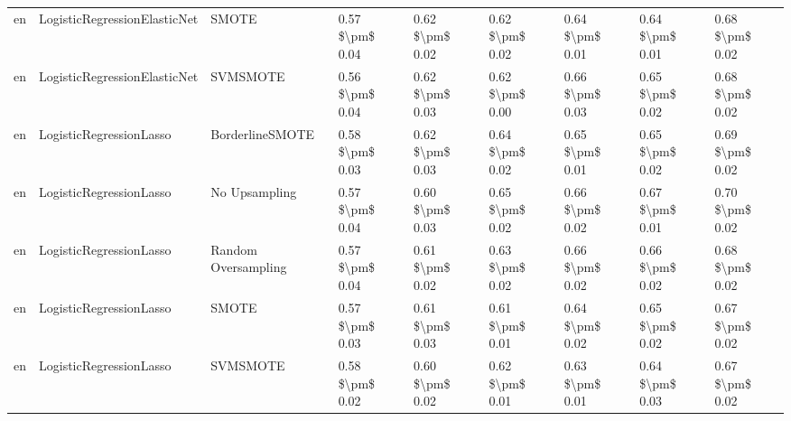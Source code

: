 \begin{tabular}{lllllllll}
      en &    LogisticRegressionElasticNet &                         SMOTE &     0.57 \$\textbackslash pm\$ 0.04 &           0.62 \$\textbackslash pm\$ 0.02 &       0.62 \$\textbackslash pm\$ 0.02 &        0.64 \$\textbackslash pm\$ 0.01 &                         0.64 \$\textbackslash pm\$ 0.01 &     0.68 \$\textbackslash pm\$ 0.02 \\
      en &    LogisticRegressionElasticNet &                      SVMSMOTE &     0.56 \$\textbackslash pm\$ 0.04 &           0.62 \$\textbackslash pm\$ 0.03 &       0.62 \$\textbackslash pm\$ 0.00 &        0.66 \$\textbackslash pm\$ 0.03 &                         0.65 \$\textbackslash pm\$ 0.02 &     0.68 \$\textbackslash pm\$ 0.02 \\
      en &         LogisticRegressionLasso &               BorderlineSMOTE &     0.58 \$\textbackslash pm\$ 0.03 &           0.62 \$\textbackslash pm\$ 0.03 &       0.64 \$\textbackslash pm\$ 0.02 &        0.65 \$\textbackslash pm\$ 0.01 &                         0.65 \$\textbackslash pm\$ 0.02 &     0.69 \$\textbackslash pm\$ 0.02 \\
      en &         LogisticRegressionLasso &                 No Upsampling &     0.57 \$\textbackslash pm\$ 0.04 &           0.60 \$\textbackslash pm\$ 0.03 &       0.65 \$\textbackslash pm\$ 0.02 &        0.66 \$\textbackslash pm\$ 0.02 &                         0.67 \$\textbackslash pm\$ 0.01 &     0.70 \$\textbackslash pm\$ 0.02 \\
      en &         LogisticRegressionLasso &           Random Oversampling &     0.57 \$\textbackslash pm\$ 0.04 &           0.61 \$\textbackslash pm\$ 0.02 &       0.63 \$\textbackslash pm\$ 0.02 &        0.66 \$\textbackslash pm\$ 0.02 &                         0.66 \$\textbackslash pm\$ 0.02 &     0.68 \$\textbackslash pm\$ 0.02 \\
      en &         LogisticRegressionLasso &                         SMOTE &     0.57 \$\textbackslash pm\$ 0.03 &           0.61 \$\textbackslash pm\$ 0.03 &       0.61 \$\textbackslash pm\$ 0.01 &        0.64 \$\textbackslash pm\$ 0.02 &                         0.65 \$\textbackslash pm\$ 0.02 &     0.67 \$\textbackslash pm\$ 0.02 \\
      en &         LogisticRegressionLasso &                      SVMSMOTE &     0.58 \$\textbackslash pm\$ 0.02 &           0.60 \$\textbackslash pm\$ 0.02 &       0.62 \$\textbackslash pm\$ 0.01 &        0.63 \$\textbackslash pm\$ 0.01 &                         0.64 \$\textbackslash pm\$ 0.03 &     0.67 \$\textbackslash pm\$ 0.02 \\

\end{tabular}
